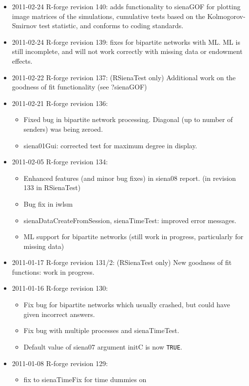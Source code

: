\documentclass[a4paper,fleqn,11pt]{article}
\newcommand{\+}{\, + \,}
\begin{document}
\begin{small}
\begin{itemize}
\item 2011-02-24 R-forge revision 140: adds functionality to sienaGOF
  for plotting
  image matrices of the simulations, cumulative tests based on the Kolmogorov-
  Smirnov test statistic, and conforms to coding standards.
\item 2011-02-24 R-forge revision 139: fixes for bipartite networks with
  ML. ML is still incomplete, and will not work correctly with missing data or
  endowment effects.
\item 2011-02-22 R-forge revision 137: (RSienaTest only)
Additional work on the goodness of fit functionality (see ?sienaGOF)
\item 2011-02-21 R-forge revision 136:
\begin{itemize}
\item Fixed bug in bipartite network processing. Diagonal (up to number of
  senders) was being zeroed.
\item siena01Gui: corrected test for maximum degree in display.
\end{itemize}
\item 2011-02-05 R-forge revision 134:
\begin{itemize}
\item Enhanced features (and minor bug fixes) in siena08 report. (in revision
  133 in RSienaTest)
\item Bug fix in iwlsm
\item sienaDataCreateFromSession, sienaTimeTest: improved error messages.
\item ML support for bipartite networks (still work in progress,
  particularly for missing data)
\end{itemize}
\item 2011-01-17 R-forge revision 131/2: (RSienaTest only)
New goodness of fit functions: work in progress.
\item 2011-01-16 R-forge revision 130:
\begin{itemize}
\item Fix bug for bipartite networks which usually crashed, but could have given
  incorrect answers.
\item Fix bug with multiple processes and sienaTimeTest.
\item Default value of siena07 argument initC is now \texttt{TRUE}.
\end{itemize}
\item 2011-01-08  R-forge revision 129:
\begin{itemize}
\item fix to sienaTimeFix for time dummies on

\end{itemize}
\end{itemize}
\end{small}
\end{document}
